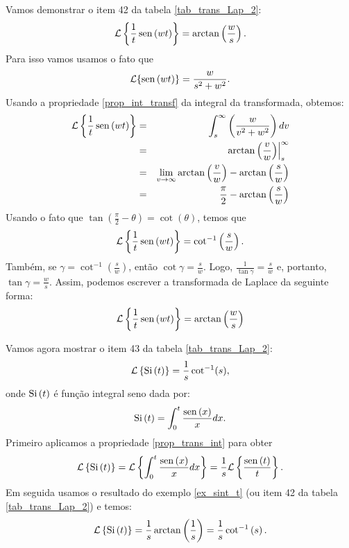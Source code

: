 \begin{ex}{\label{ex_sint_t}}Vamos demonstrar o item 42 da tabela \ref{tab_trans_Lap_2}:
\begin{equation}
\mathcal{L}\left\{\frac{1}{t}\operatorname{sen}\,(wt)\right\}=\arctan\left(\frac{w}{s}\right).
\end{equation}
Para isso vamos usamos o fato que
\begin{equation*}
\mathcal{L}\{\operatorname{sen}\,(wt)\}=\frac{w}{s^2+w^2}.
\end{equation*}
Usando a propriedade \ref{prop_int_transf} da integral da transformada, obtemos:
\begin{eqnarray*}
\mathcal{L}\left\{\frac{1}{t}\operatorname{sen}\,(wt)\right\}&=&\int_s^\infty \left(\frac{w}{v^2+w^2}\right)dv\\
&=& \left.\arctan\left(\frac{v}{w}\right)\right|_s^\infty\\
&=&\lim_{v\to\infty}\arctan\left(\frac{v}{w}\right)-\arctan\left(\frac{s}{w}\right)\\
&=&\frac{\pi}{2}-\arctan\left(\frac{s}{w}\right)\\
\end{eqnarray*}
Usando o fato que $\tan\left(\frac{\pi}{2}-\theta\right)=\cot(\theta)$, temos que
\begin{eqnarray*}
\mathcal{L}\left\{\frac{1}{t}\operatorname{sen}\,(wt)\right\}=\cot^{-1}\left(\frac{s}{w}\right).
\end{eqnarray*}
Também, se $\gamma=\cot^{-1}\left(\frac{s}{w}\right)$, então $\cot\gamma=\frac{s}{w}$. Logo, $\frac{1}{\tan\gamma}=\frac{s}{w}$ e, portanto, $\tan\gamma=\frac{w}{s}$. Assim, podemos escrever a transformada de Laplace da seguinte forma:
\begin{eqnarray*}
\mathcal{L}\left\{\frac{1}{t}\operatorname{sen}\,(wt)\right\}=\arctan\left(\frac{w}{s}\right)
\end{eqnarray*}
\end{ex}
\begin{ex}Vamos agora mostrar o item 43 da tabela \ref{tab_trans_Lap_2}:
\begin{equation}
\mathcal{L}\left\{\hbox{Si}\ \!(t)\right\}=\frac{1}{s}\cot^{-1}(s),
\end{equation}
onde $\hbox{Si}\ \!(t)$ é função integral seno dada por:
\begin{equation}
\hbox{Si}\ \!(t)=\int_0^t\frac{\sen(x)}{x}dx.
\end{equation}
Primeiro aplicamos a propriedade \ref{prop_trans_int} para obter
\begin{equation}
\mathcal{L}\left\{\hbox{Si}\ \!(t)\right\}=\mathcal{L}\left\{\int_0^t\frac{\sen(x)}{x}dx\right\}=\frac{1}{s}\mathcal{L}\left\{\frac{\sen(t)}{t}\right\}.
\end{equation}
Em seguida usamos o resultado do exemplo \ref{ex_sint_t} (ou item 42 da tabela \ref{tab_trans_Lap_2}) e temos:
\begin{equation}
\mathcal{L}\left\{\hbox{Si}\ \!(t)\right\}=\frac{1}{s}\arctan\left(\frac{1}{s}\right)=\frac{1}{s}\cot^{-1}\left(s\right).
\end{equation}
\end{ex}

